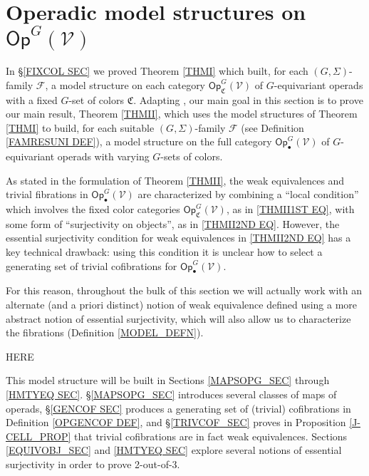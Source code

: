 \documentclass[a4paper,10pt
,draft
]{article}%
\numberwithin{equation}{section}
\numberwithin{figure}{section}
\theoremstyle{definition} %
\newcommand{\F}{\ensuremath{\mathcal F}}
\newcommand{\V}{\ensuremath{\mathcal V}}
\newcommand{\C}{\ensuremath{\mathcal C}}
\newcommand{\1}{\ensuremath{\mathbbm 1}}%
\begin{document}
  







\newpage


\section{Operadic model structures on $\mathsf{Op}^G(\mathcal{V})$}\label{MS_SEC}

\renewcommand{\C}{\mathfrak C}


In \S \ref{FIXCOL SEC} we proved Theorem \ref{THMI} which built, 
for each $(G,\Sigma)$-family $\F$,
a model structure on each category
$\mathsf{Op}_{\mathfrak{C}}^G(\V)$
of $G$-equivariant operads with a fixed $G$-set of colors $\mathfrak{C}$.
Adapting \cite{BM13,Cav,CM13b},
our main goal in this section is 
to prove our main result, Theorem \ref{THMII},
which uses the model structures of Theorem \ref{THMI}
to build,
for each suitable $(G,\Sigma)$-family $\F$ 
(see Definition \ref{FAMRESUNI DEF}),
a model structure on the full category $\mathsf{Op}^G_\bullet(\mathcal{V})$
of $G$-equivariant operads with varying $G$-sets of colors. 


As stated in the formulation of Theorem \ref{THMII},
the weak equivalences and trivial fibrations 
in $\mathsf{Op}^G_\bullet(\V)$
are characterized by combining
a ``local condition'' which involves the fixed color categories $\mathsf{Op}_{\mathfrak{C}}^G(\V)$,
as in \eqref{THMII1ST EQ},
with some form of ``surjectivity on objects'',
as in \eqref{THMII2ND EQ}.
However, the essential surjectivity condition for 
weak equivalences in \eqref{THMII2ND EQ}
has a key technical drawback: 
using this condition 
it is unclear how to select a generating set of trivial cofibrations 
for $\mathsf{Op}^G_\bullet(\V)$.

For this reason, 
throughout the bulk of this section we will actually work with 
an alternate (and a priori distinct)
notion of weak equivalence
defined using a more abstract notion of essential surjectivity,
which will also allow us to characterize the fibrations (Definition \ref{MODEL_DEFN}).

{\color{blue} HERE}



This model structure will be built in Sections \ref{MAPSOPG_SEC} through \ref{HMTYEQ SEC}.
\S \ref{MAPSOPG_SEC} introduces several classes of maps of operads,
\S \ref{GENCOF SEC} produces a generating set of (trivial) cofibrations in Definition \ref{OPGENCOF DEF},
and \S \ref{TRIVCOF_SEC} proves in Proposition \ref{J-CELL_PROP} that trivial cofibrations are in fact weak equivalences.
Sections \ref{EQUIVOBJ_SEC} and \ref{HMTYEQ SEC} explore several notions of essential surjectivity in order to prove 2-out-of-3.
\end{document}
